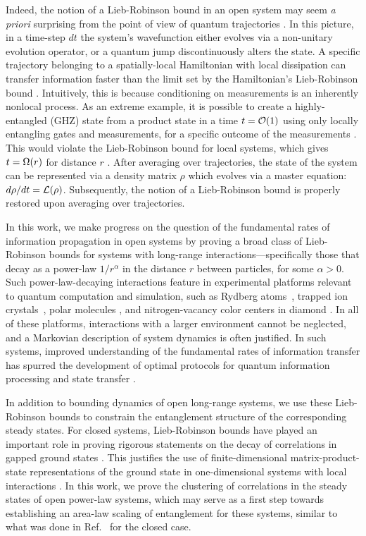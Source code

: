 Indeed, the notion of a  Lieb-Robinson bound in an open system may seem \textit{a priori}  surprising from the point of view of quantum trajectories \cite{Knight1998}. In this picture,  in a time-step $dt$ the system's wavefunction either evolves via a non-unitary evolution operator, or a quantum jump discontinuously  alters the state.
A specific  trajectory belonging to a spatially-local Hamiltonian with local dissipation can transfer information faster than  the limit set by the Hamiltonian's Lieb-Robinson bound \cite{Ashida2018}. Intuitively, this is because conditioning on measurements is an inherently nonlocal process.  As an extreme example, it is possible to create a highly-entangled (GHZ) state from a product state in a time $t = \O{1}$ using only locally entangling gates  and measurements, for a specific outcome of the measurements \cite{Pham2013}.  This would violate the Lieb-Robinson bound for local systems, which gives $t = \W{r}$ for distance $r$ \cite{bigO}. After averaging over trajectories, the state of the system can be represented via a density matrix $\rho$ which evolves via a master equation: $ d \rho / dt =  \mathcal{L} (\rho) $. Subsequently, the notion of a Lieb-Robinson bound is properly restored upon averaging over trajectories.

In this work, we make progress on the question of the fundamental rates of information propagation in open systems by proving a broad class of Lieb-Robinson bounds for systems with long-range interactions---specifically those that decay as a power-law $1/r^\alpha$ in the distance  $r$ between particles, for some $\alpha > 0$.
Such power-law-decaying interactions feature in experimental platforms relevant to quantum computation and simulation, such as Rydberg atoms~\cite{Saffman2010}, trapped ion crystals~\cite{Britton2012,Monroe2021}, polar molecules \cite{Yan2013}, and nitrogen-vacancy color centers in diamond \cite{Yao2012}.
In all of these platforms, interactions with a larger environment cannot be neglected, and a Markovian description of system dynamics is often justified.  In such systems, improved understanding of the fundamental rates of information transfer has spurred the development of optimal protocols for quantum information processing and state transfer \cite{Eldredge2017,Tran2021a}.

In addition to bounding dynamics of open long-range systems, we use these Lieb-Robinson bounds to constrain the entanglement structure of the corresponding steady states.
For closed systems, Lieb-Robinson bounds have played an important role in proving rigorous statements on the decay of correlations in gapped ground states \cite{Hastings2006}. This justifies the use of finite-dimensional matrix-product-state representations of the ground state in one-dimensional systems with local interactions \cite{Hastings2007}.
In this work, we prove the clustering of correlations in the steady states of open power-law systems, which may serve as a first step towards establishing an area-law scaling of entanglement for these systems, similar to what was done in Ref.~\cite{Gong2017} for the closed case.

